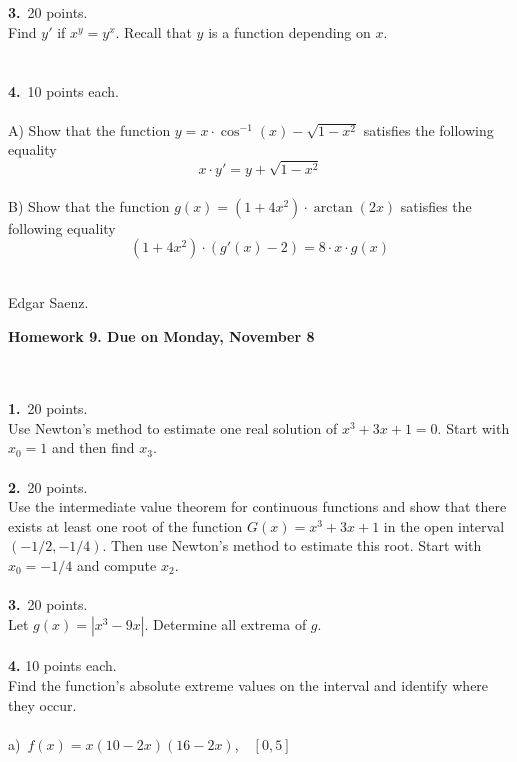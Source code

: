 \documentclass[12pt]{article}
\begin{document}
\\
\\
\textbf{3.}\ 20 points.\\
Find $y'$ if $x^{y}=y^{x}$. Recall that $y$ is a function depending
on $x$.
\\
\\
\\
\textbf{4.}\ 10 points each.\\
\\
A)  Show that the function $y=x\cdot\cos^{-1}(x)-\sqrt{1-x^2}$ satisfies the following equality
$$x\cdot y'=y+\sqrt{1-x^2}$$
\\
B)  Show that the function $g(x)=(1+4x^{2})\cdot \arctan(2x)$ satisfies the following equality
$$(1+4x^{2})\cdot (g'(x)-2)=8\cdot x\cdot g(x)$$
\\
\begin{flushright}
Edgar Saenz.
\end{flushright}
\newpage
\begin{center}
\textbf{Homework 9. Due on Monday, November 8} \\
\end{center}\
\\
\\
\textbf{1.}\ 20 points.\\
Use Newton's method to estimate one real solution of $x^{3}+3x+1=0$.
Start with $x_{0}=1$ and then find $x_{3}$.
\\
\\
\textbf{2.}\ 20 points.\\
Use the intermediate value theorem for continuous functions and show
that there exists at least one root of the function
$G(x)=x^{3}+3x+1$ in the open interval $(-1/2,-1/4)$. Then use
Newton's method to estimate
this root. Start with $x_{0}=-1/4$ and compute $x_{2}$.\\
\\
\textbf{3.}\ 20 points.\\
Let $g(x)=|x^{3}-9x|$. Determine all extrema of $g$.\\
\\
\textbf{4.} 10 points each.\\
Find the function's absolute extreme values on the interval and identify where they occur.\\
\\
a)\ $f(x)=x(10-2x)(16-2x)$,\ \ $[0,5]$\\
\\
\end{document}

